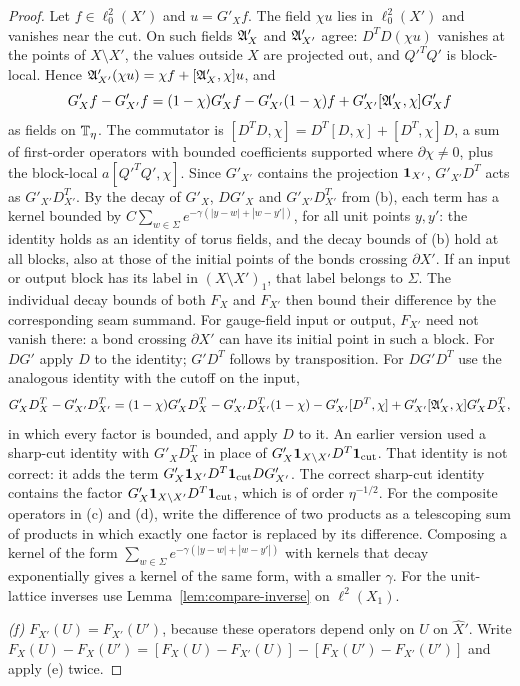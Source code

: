 \begin{proof}
Let $f\in\ell^2_0(X')$ and $u=G'_Xf$. The field $\chi u$ lies in $\ell^2_0(X')$ and vanishes near the cut. On such fields $\mathfrak A'_X$ and $\mathfrak A'_{X'}$ agree: $D^TD(\chi u)$ vanishes at the points of $X\setminus X'$, the values outside $X$ are projected out, and $Q'^TQ'$ is block-local. Hence $\mathfrak A'_{X'}(\chi u)=\chi f+[\mathfrak A'_X,\chi]u$, and
\[
G'_Xf-G'_{X'}f=(1-\chi)G'_Xf-G'_{X'}(1-\chi)f+G'_{X'}[\mathfrak A'_X,\chi]G'_Xf
\]
as fields on $\mathbb T_\eta$. The commutator is $[D^TD,\chi]=D^T[D,\chi]+[D^T,\chi]D$, a sum of first-order operators with bounded coefficients supported where $\partial\chi\ne0$, plus the block-local $a[Q'^TQ',\chi]$. Since $G'_{X'}$ contains the projection $\mathbf 1_{X'}$, $G'_{X'}D^T$ acts as $G'_{X'}D^T_{X'}$. By the decay of $G'_X$, $DG'_X$ and $G'_{X'}D^T_{X'}$ from (b), each term has a kernel bounded by $C\sum_{w\in\Sigma}e^{-\gamma(|y-w|+|w-y'|)}$, for all unit points $y,y'$: the identity holds as an identity of torus fields, and the decay bounds of (b) hold at all blocks, also at those of the initial points of the bonds crossing $\partial X'$. If an input or output block has its label in $(X\setminus X')_1$, that label belongs to $\Sigma$. The individual decay bounds of both $F_X$ and $F_{X'}$ then bound their difference by the corresponding seam summand. For gauge-field input or output, $F_{X'}$ need not vanish there: a bond crossing $\partial X'$ can have its initial point in such a block. For $DG'$ apply $D$ to the identity; $G'D^T$ follows by transposition. For $DG'D^T$ use the analogous identity with the cutoff on the input,
\[
G'_XD^T_X-G'_{X'}D^T_{X'}=(1-\chi)G'_XD^T_X-G'_{X'}D^T_{X'}(1-\chi)-G'_{X'}[D^T,\chi]+G'_{X'}[\mathfrak A'_X,\chi]G'_XD^T_X ,
\]
in which every factor is bounded, and apply $D$ to it. An earlier version used a sharp-cut identity with $G'_XD^T_X$ in place of $G'_X\mathbf 1_{X\setminus X'}D^T\mathbf 1_{\rm cut}$. That identity is not correct: it adds the term $G'_X\mathbf 1_{X'}D^T\mathbf 1_{\rm cut}DG'_{X'}$. The correct sharp-cut identity contains the factor $G'_X\mathbf 1_{X\setminus X'}D^T\mathbf 1_{\rm cut}$, which is of order $\eta^{-1/2}$. For the composite operators in (c) and (d), write the difference of two products as a telescoping sum of products in which exactly one factor is replaced by its difference. Composing a kernel of the form $\sum_{w\in\Sigma}e^{-\gamma(|y-w|+|w-y'|)}$ with kernels that decay exponentially gives a kernel of the same form, with a smaller $\gamma$. For the unit-lattice inverses use Lemma~\ref{lem:compare-inverse} on $\ell^2(X_1)$.

\emph{(f)} $F_{X'}(U)=F_{X'}(U')$, because these operators depend only on $U$ on $\hat X'$. Write $F_X(U)-F_X(U')=[F_X(U)-F_{X'}(U)]-[F_X(U')-F_{X'}(U')]$ and apply (e) twice.


\end{proof}
